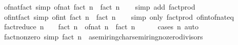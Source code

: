 \begin{isabellebody}
\ of{\isacharunderscore}{\kern0pt}nat{\isacharunderscore}{\kern0pt}fact\ {\isacharbrackleft}{\kern0pt}simp{\isacharbrackright}{\kern0pt}{\isacharcolon}{\kern0pt}\ {\isachardoublequoteopen}of{\isacharunderscore}{\kern0pt}nat\ {\isacharparenleft}{\kern0pt}fact\ n{\isacharparenright}{\kern0pt}\ {\isacharequal}{\kern0pt}\ fact\ n{\isachardoublequoteclose}\isanewline
%
\isadelimproof
\ \ %
\endisadelimproof
%
\isatagproof
{}\isamarkupfalse%
\ {\isacharparenleft}{\kern0pt}simp\ add{\isacharcolon}{\kern0pt}\ fact{\isacharunderscore}{\kern0pt}prod{\isacharparenright}{\kern0pt}%
\endisatagproof
{\isafoldproof}%
%
\isadelimproof
\isanewline
%
\endisadelimproof
\isanewline
{}\isamarkupfalse%
\ of{\isacharunderscore}{\kern0pt}int{\isacharunderscore}{\kern0pt}fact\ {\isacharbrackleft}{\kern0pt}simp{\isacharbrackright}{\kern0pt}{\isacharcolon}{\kern0pt}\ {\isachardoublequoteopen}of{\isacharunderscore}{\kern0pt}int\ {\isacharparenleft}{\kern0pt}fact\ n{\isacharparenright}{\kern0pt}\ {\isacharequal}{\kern0pt}\ fact\ n{\isachardoublequoteclose}\isanewline
%
\isadelimproof
\ \ %
\endisadelimproof
%
\isatagproof
{}\isamarkupfalse%
\ {\isacharparenleft}{\kern0pt}simp\ only{\isacharcolon}{\kern0pt}\ fact{\isacharunderscore}{\kern0pt}prod\ of{\isacharunderscore}{\kern0pt}int{\isacharunderscore}{\kern0pt}of{\isacharunderscore}{\kern0pt}nat{\isacharunderscore}{\kern0pt}eq{\isacharparenright}{\kern0pt}%
\endisatagproof
{\isafoldproof}%
%
\isadelimproof
\isanewline
%
\endisadelimproof
\isanewline
{}\isamarkupfalse%
\ fact{\isacharunderscore}{\kern0pt}reduce{\isacharcolon}{\kern0pt}\ {\isachardoublequoteopen}n\ {\isachargreater}{\kern0pt}\ {}\ {\isasymLongrightarrow}\ fact\ n\ {\isacharequal}{\kern0pt}\ of{\isacharunderscore}{\kern0pt}nat\ n\ {\isacharasterisk}{\kern0pt}\ fact\ {\isacharparenleft}{\kern0pt}n\ {\isacharminus}{\kern0pt}\ {}{\isacharparenright}{\kern0pt}{\isachardoublequoteclose}\isanewline
%
\isadelimproof
\ \ %
\endisadelimproof
%
\isatagproof
{}\isamarkupfalse%
\ {\isacharparenleft}{\kern0pt}cases\ n{\isacharparenright}{\kern0pt}\ auto%
\endisatagproof
{\isafoldproof}%
%
\isadelimproof
\isanewline
%
\endisadelimproof
\isanewline
{}\isamarkupfalse%
\ fact{\isacharunderscore}{\kern0pt}nonzero\ {\isacharbrackleft}{\kern0pt}simp{\isacharbrackright}{\kern0pt}{\isacharcolon}{\kern0pt}\ {\isachardoublequoteopen}fact\ n\ {\isasymnoteq}\ {\isacharparenleft}{\kern0pt}{}{\isacharcolon}{\kern0pt}{\isacharcolon}{\kern0pt}{\isacharprime}{\kern0pt}a{\isacharcolon}{\kern0pt}{\isacharcolon}{\kern0pt}{\isacharbraceleft}{\kern0pt}semiring{\isacharunderscore}{\kern0pt}char{\isacharunderscore}{\kern0pt}{}{\isacharcomma}{\kern0pt}semiring{\isacharunderscore}{\kern0pt}no{\isacharunderscore}{\kern0pt}zero{\isacharunderscore}{\kern0pt}divisors{\isacharbraceright}{\kern0pt}{\isacharparenright}{\kern0pt}{\isachardoublequoteclose}\isanewline

\end{isabellebody}
